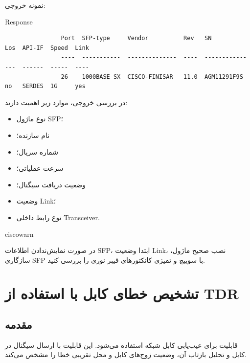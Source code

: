 \documentclass[11pt,letterpaper]{report}
\newenvironment{tipbox}[1]{%
	\begin{noticebox}[title={\textbf{\faLightbulb\ #1}}]{ciscowarn}
	}{%
	\end{noticebox}
}
\begin{document}
		نمونه خروجی:

		\begin{latin}
			\begin{cliexample}{Response}
				\begin{verbatim}
				Port  SFP-type     Vendor          Rev   SN            Los  API-IF  Speed  Link
				----  -----------  --------------  ----  ------------  ---  ------  -----  ----
				26    1000BASE_SX  CISCO-FINISAR   11.0  AGM11291F9S   no   SERDES  1G     yes
				\end{verbatim}
			\end{cliexample}
		\end{latin}

		در بررسی خروجی، موارد زیر اهمیت دارند:

		\begin{itemize}
			\item نوع ماژول SFP؛
			\item نام سازنده؛
			\item شماره سریال؛
			\item سرعت عملیاتی؛
			\item وضعیت دریافت سیگنال؛
			\item وضعیت Link؛
			\item نوع رابط داخلی Transceiver.
		\end{itemize}

		\begin{tipbox}{نکته عیب‌یابی}
			در صورت نمایش‌ندادن اطلاعات SFP، ابتدا وضعیت Link، نصب صحیح
			ماژول، سازگاری SFP با سوییچ و تمیزی کانکتورهای فیبر نوری را
			بررسی کنید.
		\end{tipbox}



		\chapter{تشخیص خطای کابل با استفاده از TDR}

		\section{مقدمه}

		قابلیت  برای عیب‌یابی کابل
		شبکه استفاده می‌شود. این قابلیت با ارسال سیگنال در کابل و تحلیل
		بازتاب آن، وضعیت زوج‌های کابل و محل تقریبی خطا را مشخص می‌کند.
\end{document}
